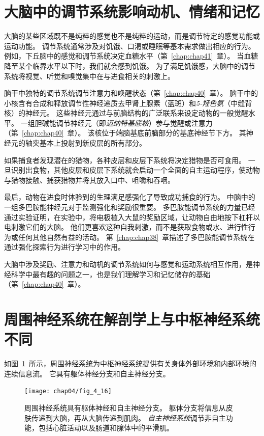 \section{大脑中的调节系统影响动机、情绪和记忆}

大脑的某些区域既不是纯粹的感觉也不是纯粹的运动，而是调节特定的感觉功能或运动功能。
调节系统通常涉及对饥饿、口渴或睡眠等基本需求做出相应的行为。
例如，下丘脑中的感觉和调节系统决定血糖水平（第~\ref{chap:chap41}~章）。
当血糖降至某个临界水平以下时，我们就会感到饥饿。
为了满足饥饿感，大脑中的调节系统将视觉、听觉和嗅觉集中在与进食相关的刺激上。


脑干中独特的调节系统调节注意力和唤醒状态（第~\ref{chap:chap40}~章）。 
脑干中的小核含有合成和释放调节性神经递质去甲肾上腺素（蓝斑）和\textit{5-羟色氨}（中缝背核）的神经元。 
这些神经元通过与前脑结构的广泛联系来设定动物的一般觉醒水平。 
一组胆碱能调节神经元（即\textit{迈纳特基底核}）参与觉醒或注意力（第~\ref{chap:chap40}~章）。
该核位于端脑基底前脑部分的基底神经节下方。 
其神经元的轴突基本上投射到新皮层的所有部分。


如果捕食者发现潜在的猎物，各种皮层和皮层下系统将决定猎物是否可食用。 
一旦识别出食物，其他皮层和皮层下系统就会启动一个全面的自主运动程序，使动物与猎物接触、捕获猎物并将其放入口中、咀嚼和吞咽。


最后，动物在进食时体验到的生理满足感强化了导致成功捕食的行为。
中脑中的一组多巴胺能神经元对于监测强化和奖励很重要。 
多巴胺能调节系统的力量已经通过实验证明，在实验中，将电极植入大鼠的奖励区域，让动物自由地按下杠杆以电刺激它们的大脑。 
他们更喜欢这种自我刺激，而不是获取食物或水、进行性行为或任何其他自然有益的活动。 
第~\ref{chap:chap38}~章描述了多巴胺能调节系统在通过强化探索行为进行学习中的作用。


大脑中涉及奖励、注意力和动机的调节系统如何与感觉和运动系统相互作用，是神经科学中最有趣的问题之一，也是我们理解学习和记忆储存的基础（第~\ref{chap:chap40}~章）。



\section{周围神经系统在解剖学上与中枢神经系统不同}

如图~\ref{fig:4_16}~所示，周围神经系统为中枢神经系统提供有关身体外部环境和内部环境的连续信息流。
它具有躯体神经分支和自主神经分支。


\begin{figure}[htbp]
	\centering
	\texttt{[image: chap04/fig\_4\_16]}
	\caption{周围神经系统具有躯体神经和自主神经分支。
		躯体分支将信息从皮肤传递到大脑，再从大脑传递到肌肉。
		\textit{自主神经系统}调节非自主功能，包括心脏活动以及肠道和腺体中的平滑肌。}
	\label{fig:4_16}
\end{figure}


